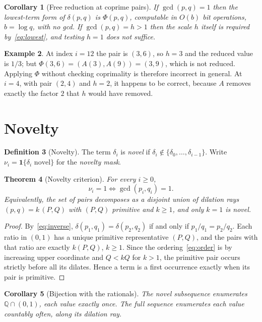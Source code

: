 \documentclass[11pt,a4paper]{article}
\theoremstyle{plain}
\newtheorem{theorem}{Theorem}[section]
\newtheorem{corollary}[theorem]{Corollary}
\theoremstyle{definition}
\newtheorem{definition}[theorem]{Definition}
\newtheorem{example}[theorem]{Example}
\theoremstyle{remark}
\newcommand{\Q}{\mathbb{Q}}
\begin{document}
\begin{corollary}[Free reduction at coprime pairs]\label{cor:free}
If $\gcd(p,q) = 1$ then the lowest-term form of $\delta(p,q)$ is $\Phi(p,q)$,
computable in $O(b)$ bit operations, $b = \log q$, with no gcd. If
$\gcd(p,q) = h > 1$ then the scale $h$ itself is required
by~\eqref{eq:lowest}, and testing $h = 1$ does not suffice.
\end{corollary}

\begin{example}
At index $i = 12$ the pair is $(3,6)$, so $h = 3$ and the reduced value is
$1/3$; but $\Phi(3,6) = (A(3), A(9)) = (3,9)$, which is not reduced. Applying
$\Phi$ without checking coprimality is therefore incorrect in general. At
$i = 4$, with pair $(2,4)$ and $h = 2$, it happens to be correct, because $A$
removes exactly the factor $2$ that $h$ would have removed.
\end{example}

\section{Novelty}
\label{sec:novelty}

\begin{definition}[Novelty]
The term $\delta_i$ is \emph{novel} if $\delta_i \notin \{\delta_0, \dots,
\delta_{i-1}\}$. Write $\nu_i = \mathbf{1}\{\delta_i \text{ novel}\}$ for the
\emph{novelty mask}.
\end{definition}

\begin{theorem}[Novelty criterion]\label{thm:novelty}
For every $i \ge 0$,
\[
  \nu_i = 1 \iff \gcd(p_i, q_i) = 1 .
\]
Equivalently, the set of pairs decomposes as a disjoint union of dilation rays
$(p,q) = k\,(P,Q)$ with $(P,Q)$ primitive and $k \ge 1$, and only $k = 1$ is
novel.
\end{theorem}

\begin{proof}
By~\eqref{eq:inverse}, $\delta(p_1,q_1) = \delta(p_2,q_2)$ if and only if
$p_1/q_1 = p_2/q_2$. Each ratio in $(0,1)$ has a unique primitive representative
$(P,Q)$, and the pairs with that ratio are exactly $k(P,Q)$, $k \ge 1$. Since
the ordering~\eqref{eq:order} is by increasing upper coordinate and $Q < kQ$ for
$k > 1$, the primitive pair occurs strictly before all its dilates. Hence a term
is a first occurrence exactly when its pair is primitive.
\end{proof}

\begin{corollary}[Bijection with the rationals]\label{cor:bijection}
The novel subsequence enumerates $\Q \cap (0,1)$, each value exactly once. The
full sequence enumerates each value countably often, along its dilation ray.
\end{corollary}
\end{document}
